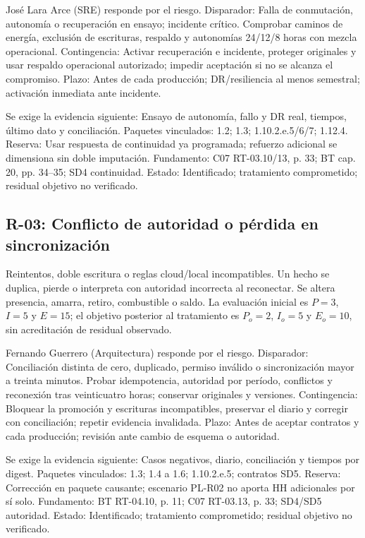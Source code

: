 José Lara Arce (SRE) responde por el riesgo. Disparador: Falla de conmutación, autonomía o recuperación en ensayo; incidente crítico. Comprobar caminos de energía, exclusión de escrituras, respaldo y autonomías 24/12/8 horas con mezcla operacional. Contingencia: Activar recuperación e incidente, proteger originales y usar respaldo operacional autorizado; impedir aceptación si no se alcanza el compromiso. Plazo: Antes de cada producción; DR/resiliencia al menos semestral; activación inmediata ante incidente.

Se exige la evidencia siguiente: Ensayo de autonomía, fallo y DR real, tiempos, último dato y conciliación. Paquetes vinculados: 1.2; 1.3; 1.10.2.e.5/6/7; 1.12.4. Reserva: Usar respuesta de continuidad ya programada; refuerzo adicional se dimensiona sin doble imputación. Fundamento: C07 RT-03.10/13, p. 33; BT cap. 20, pp. 34–35; SD4 continuidad. Estado: Identificado; tratamiento comprometido; residual objetivo no verificado. \parencites[RT-03.10/13, p.~33]{sd8-c07}[cap.~20, pp.~34--35]{sd8-bt}

\subsection{R-03: Conflicto de autoridad o pérdida en sincronización}
Reintentos, doble escritura o reglas cloud/local incompatibles. Un hecho se duplica, pierde o interpreta con autoridad incorrecta al reconectar. Se altera presencia, amarra, retiro, combustible o saldo. La evaluación inicial es $P=3$, $I=5$ y $E=15$; el objetivo posterior al tratamiento es $P_o=2$, $I_o=5$ y $E_o=10$, sin acreditación de residual observado.

Fernando Guerrero (Arquitectura) responde por el riesgo. Disparador: Conciliación distinta de cero, duplicado, permiso inválido o sincronización mayor a treinta minutos. Probar idempotencia, autoridad por período, conflictos y reconexión tras veinticuatro horas; conservar originales y versiones. Contingencia: Bloquear la promoción y escrituras incompatibles, preservar el diario y corregir con conciliación; repetir evidencia invalidada. Plazo: Antes de aceptar contratos y cada producción; revisión ante cambio de esquema o autoridad.

Se exige la evidencia siguiente: Casos negativos, diario, conciliación y tiempos por digest. Paquetes vinculados: 1.3; 1.4 a 1.6; 1.10.2.e.5; contratos SD5. Reserva: Corrección en paquete causante; escenario PL-R02 no aporta HH adicionales por sí solo. Fundamento: BT RT-04.10, p. 11; C07 RT-03.13, p. 33; SD4/SD5 autoridad. Estado: Identificado; tratamiento comprometido; residual objetivo no verificado. \parencites[RT-04.10, p.~11]{sd8-bt}[RT-03.13, p.~33]{sd8-c07}

